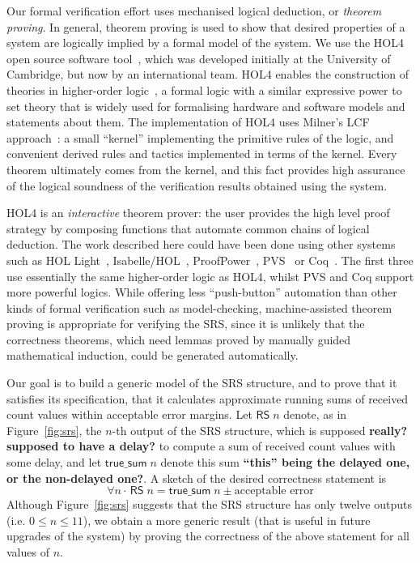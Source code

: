\documentclass{llncs}
\begin{document}
Our formal verification effort uses mechanised logical deduction, or \emph{theorem proving}.
In general, theorem proving is used to show that desired properties of a system are logically implied by a formal model of the system.
We use the HOL4 open source software tool~\cite{HOL4,DBLP:conf/tphol/SlindN08}, which was developed initially at the University of Cambridge, but now by an international team.
HOL4 enables the construction of theories in higher-order logic~\cite{DBLP:journals/jsyml/Church40}, a formal logic with a similar expressive power to set theory that is widely used for formalising hardware and software models and statements about them.
The implementation of HOL4 uses Milner's LCF approach~\cite{Milner:1972:LCF:891954}: a small ``kernel'' implementing the primitive rules of the logic, and convenient derived rules and tactics implemented in terms of the kernel.
Every theorem ultimately comes from the kernel, and this fact provides high assurance of the logical soundness of the verification results obtained using the system.

HOL4 is an \emph{interactive} theorem prover: the user provides the high level proof strategy by composing functions that automate common chains of logical deduction.
The work described here could have been done using other systems such as HOL Light~\cite{HOLLight,DBLP:conf/tphol/Harrison09a}, Isabelle/HOL~\cite{Isabelle}, ProofPower~\cite{ProofPower}, PVS~\cite{PVS,DBLP:conf/tphol/OwreS08} or Coq~\cite{Coq}.
The first three use essentially the same higher-order logic as HOL4, whilst PVS and Coq support more powerful logics.
While offering less ``push-button'' automation than other kinds of formal verification such as model-checking, machine-assisted theorem proving is appropriate for verifying the SRS, since it is unlikely that the correctness theorems, which need lemmas proved by manually guided mathematical induction, could be generated automatically.

Our goal is to build a generic model of the SRS structure, and to prove that it satisfies its specification, that it calculates approximate running sums of received count values within acceptable error margins.
Let $\mathsf{RS}\;n$ denote, as in Figure~\ref{fig:srs}, the $n$-th output of the SRS structure, which is supposed {\bf really? supposed to have a delay?} to compute a sum of received count values with some delay, and let $\mathsf{true\_sum}\;n$ denote this sum {\bf ``this'' being the delayed one, or the non-delayed one?}.
A sketch of the desired correctness statement is \[\forall{n} \cdot \, \mathsf{RS}\;n= \mathsf{true\_sum}\; n \pm\text{acceptable error}\]
Although Figure~\ref{fig:srs} suggests that the SRS structure has only twelve outputs  (i.e. $0\leq{n}\leq11$), we obtain a more generic result (that is useful in future upgrades of the system) by proving the correctness of the above statement for all values of $n$.
\end{document}
